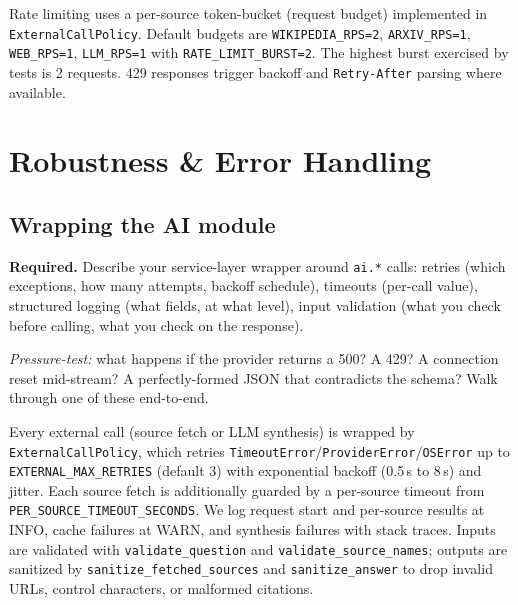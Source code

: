 \documentclass[11pt,a4paper]{article}
\begin{document}
Rate limiting uses a per-source token-bucket (request budget) implemented in \texttt{ExternalCallPolicy}. Default budgets are \texttt{WIKIPEDIA\_RPS=2}, \texttt{ARXIV\_RPS=1}, \texttt{WEB\_RPS=1}, \texttt{LLM\_RPS=1} with \texttt{RATE\_LIMIT\_BURST=2}. The highest burst exercised by tests is 2 requests. 429 responses trigger backoff and \texttt{Retry-After} parsing where available.

\section{Robustness \& Error Handling}\label{sec:robustness}

\subsection{Wrapping the AI module}

\begin{deliverbox}
\textbf{Required.} Describe your service-layer wrapper around \texttt{ai.*} calls: retries (which exceptions, how many attempts, backoff schedule), timeouts (per-call value), structured logging (what fields, at what level), input validation (what you check before calling, what you check on the response).
\end{deliverbox}

\begin{probebox}
\textit{Pressure-test:} what happens if the provider returns a 500? A 429? A connection reset mid-stream? A perfectly-formed JSON that contradicts the schema? Walk through one of these end-to-end.
\end{probebox}

Every external call (source fetch or LLM synthesis) is wrapped by \texttt{ExternalCallPolicy}, which retries \texttt{TimeoutError}/\texttt{ProviderError}/\texttt{OSError} up to \texttt{EXTERNAL\_MAX\_RETRIES} (default 3) with exponential backoff (0.5\,s to 8\,s) and jitter. Each source fetch is additionally guarded by a per-source timeout from \texttt{PER\_SOURCE\_TIMEOUT\_SECONDS}. We log request start and per-source results at INFO, cache failures at WARN, and synthesis failures with stack traces. Inputs are validated with \texttt{validate\_question} and \texttt{validate\_source\_names}; outputs are sanitized by \texttt{sanitize\_fetched\_sources} and \texttt{sanitize\_answer} to drop invalid URLs, control characters, or malformed citations.
\end{document}
